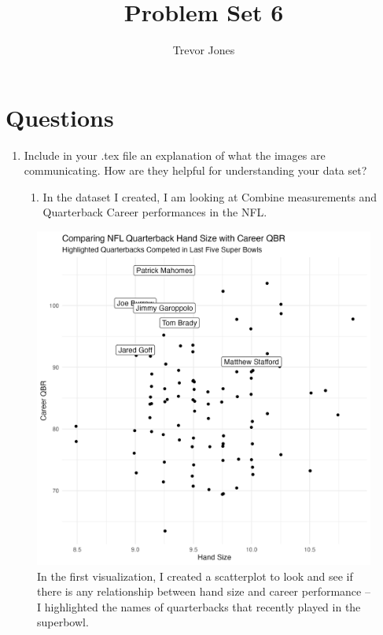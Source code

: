 \documentclass{article}
\title{Problem Set 6}
\author{Trevor Jones}
\begin{document}
\maketitle

\section{Questions}
\begin{enumerate}
    \item Include in your .tex file an explanation of what the images are communicating. How
are they helpful for understanding your data set?
    \begin{enumerate}
        \item In the dataset I created, I am looking at Combine measurements and Quarterback Career performances in the NFL. 
    \end{enumerate}
\end{enumerate}

\begin{figure}
    \centering
    \includegraphics{PS6a_Jones.png}
    \caption{In the first visualization, I created a scatterplot to look and see if there is any relationship between hand size and career performance -- I highlighted the names of quarterbacks that recently played in the superbowl. }
    \label{fig:my_label}
\end{figure}
\end{document}
